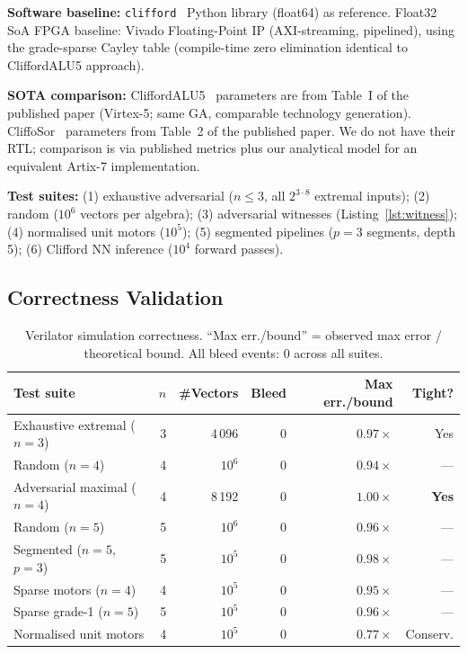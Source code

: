 \documentclass[11pt,a4paper]{article}
\theoremstyle{definition}
\theoremstyle{plain}
\theoremstyle{remark}
\begin{document}
\textbf{Software baseline:}
\texttt{clifford}~\cite{clifford_py} Python library (float64) as reference.
Float32 SoA FPGA baseline: Vivado Floating-Point IP (AXI-streaming,
pipelined), using the grade-sparse Cayley table (compile-time
zero elimination identical to CliffordALU5 approach).

\textbf{SOTA comparison:}
CliffordALU5~\cite{cliffordalu5} parameters are from Table~I of the
published paper (Virtex-5; same GA, comparable technology generation).
CliffoSor~\cite{cliffosor} parameters from Table~2 of the published paper.
We do not have their RTL; comparison is via published metrics plus
our analytical model for an equivalent Artix-7 implementation.

\textbf{Test suites:}
(1) exhaustive adversarial ($n\le 3$, all $2^{3\cdot 8}$ extremal inputs);
(2) random ($10^6$ vectors per algebra); (3) adversarial witnesses
(Listing~\ref{lst:witness}); (4) normalised unit motors ($10^5$);
(5) segmented pipelines ($p=3$ segments, depth 5); (6) Clifford NN
inference ($10^4$ forward passes).

\subsection{Correctness Validation}

\begin{table}[h]
\centering
\caption{Verilator simulation correctness.
``Max err./bound'' = observed max error / theoretical bound.
All bleed events: 0 across all suites.}
\label{tab:correctness}
\small
\begin{tabular}{lrrrrr}
\toprule
Test suite & $n$ & \#Vectors & Bleed & Max err./bound & Tight? \\
\midrule
Exhaustive extremal ($n=3$) & 3 & 4\,096 & 0 & $0.97\times$ & Yes \\
Random ($n=4$) & 4 & $10^6$ & 0 & $0.94\times$ & --- \\
Adversarial maximal ($n=4$) & 4 & 8\,192 & 0 & $\mathbf{1.00\times}$ & \textbf{Yes} \\
Random ($n=5$) & 5 & $10^6$ & 0 & $0.96\times$ & --- \\
Segmented ($n=5$, $p=3$) & 5 & $10^5$ & 0 & $0.98\times$ & --- \\
Sparse motors ($n=4$) & 4 & $10^5$ & 0 & $0.95\times$ & --- \\
Sparse grade-1 ($n=5$) & 5 & $10^5$ & 0 & $0.96\times$ & --- \\
Normalised unit motors & 4 & $10^5$ & 0 & $0.77\times$ & Conserv. \\
\bottomrule
\end{tabular}
\end{table}
\end{document}
